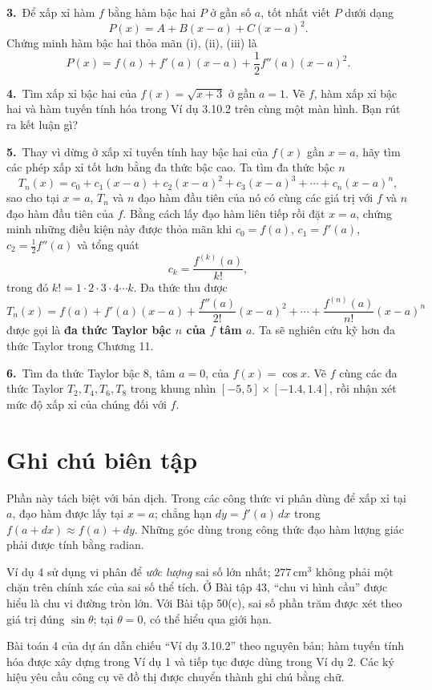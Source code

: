 \documentclass[12pt,a4paper]{article}
\begin{document}
\par\medskip\noindent\textbf{3.}\  Để xấp xỉ hàm $f$ bằng hàm bậc hai $P$ ở gần số $a$, tốt nhất viết $P$ dưới dạng
\[P(x)=A+B(x-a)+C(x-a)^2.\]
Chứng minh hàm bậc hai thỏa mãn (i), (ii), (iii) là
\[P(x)=f(a)+f'(a)(x-a)+\frac12f''(a)(x-a)^2.\]

\par\medskip\noindent\textbf{4.}\  Tìm xấp xỉ bậc hai của $f(x)=\sqrt{x+3}$ ở gần $a=1$. Vẽ $f$, hàm xấp xỉ bậc hai và hàm tuyến tính hóa trong Ví dụ 3.10.2 trên cùng một màn hình. Bạn rút ra kết luận gì?

\par\medskip\noindent\textbf{5.}\  Thay vì dừng ở xấp xỉ tuyến tính hay bậc hai của $f(x)$ gần $x=a$, hãy tìm các phép xấp xỉ tốt hơn bằng đa thức bậc cao. Ta tìm đa thức bậc $n$
\[T_n(x)=c_0+c_1(x-a)+c_2(x-a)^2+c_3(x-a)^3+\cdots+c_n(x-a)^n,\]
sao cho tại $x=a$, $T_n$ và $n$ đạo hàm đầu tiên của nó có cùng các giá trị với $f$ và $n$ đạo hàm đầu tiên của $f$. Bằng cách lấy đạo hàm liên tiếp rồi đặt $x=a$, chứng minh những điều kiện này được thỏa mãn khi $c_0=f(a)$, $c_1=f'(a)$, $c_2=\tfrac12f''(a)$ và tổng quát
\[c_k=\frac{f^{(k)}(a)}{k!},\]
trong đó $k!=1\cdot2\cdot3\cdot4\cdots k$. Đa thức thu được
\[T_n(x)=f(a)+f'(a)(x-a)+\frac{f''(a)}{2!}(x-a)^2+\cdots+\frac{f^{(n)}(a)}{n!}(x-a)^n\]
được gọi là \textbf{đa thức Taylor bậc $n$ của $f$ tâm $a$}. Ta sẽ nghiên cứu kỹ hơn đa thức Taylor trong Chương 11.

\par\medskip\noindent\textbf{6.}\  Tìm đa thức Taylor bậc $8$, tâm $a=0$, của $f(x)=\cos x$. Vẽ $f$ cùng các đa thức Taylor $T_2,T_4,T_6,T_8$ trong khung nhìn $[-5,5]\times[-1.4,1.4]$, rồi nhận xét mức độ xấp xỉ của chúng đối với $f$.

\section*{Ghi chú biên tập}
Phần này tách biệt với bản dịch. Trong các công thức vi phân dùng để xấp xỉ tại $a$, đạo hàm được lấy tại $x=a$; chẳng hạn $dy=f'(a)\,dx$ trong $f(a+dx)\approx f(a)+dy$. Những góc dùng trong công thức đạo hàm lượng giác phải được tính bằng radian.

Ví dụ 4 sử dụng vi phân để \textit{ước lượng} sai số lớn nhất; $277\,\mathrm{cm^3}$ không phải một chặn trên chính xác của sai số thể tích. Ở Bài tập 43, “chu vi hình cầu” được hiểu là chu vi đường tròn lớn. Với Bài tập 50(c), sai số phần trăm được xét theo giá trị đúng $\sin\theta$; tại $\theta=0$, có thể hiểu qua giới hạn.

Bài toán 4 của dự án dẫn chiếu “Ví dụ 3.10.2” theo nguyên bản; hàm tuyến tính hóa được xây dựng trong Ví dụ 1 và tiếp tục được dùng trong Ví dụ 2. Các ký hiệu yêu cầu công cụ vẽ đồ thị được chuyển thành ghi chú bằng chữ.
\end{document}
